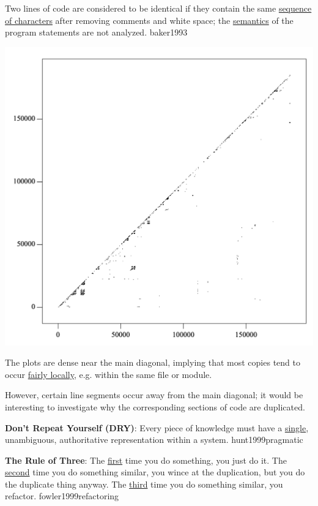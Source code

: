 \documentclass{article}
\begin{document}
  {Two lines of code are considered to be identical if they contain the same \ul{sequence of characters} after removing comments and white space; the \ul{semantics} of the program statements are not analyzed.}
  {baker1993}

\begin{multicols}{2}
\includegraphics[width=.9\columnwidth]{scatter.png}
\par\columnbreak\par
The plots are dense near the main diagonal, implying
that most copies tend to occur \ul{fairly locally}, e.g. within the
same file or module. \par However, certain line segments occur
away from the main diagonal; it would be interesting to
investigate why the corresponding sections of code are
duplicated.
\end{multicols}
\plush{}

  {\textbf{Don't Repeat Yourself (DRY)}: Every piece of knowledge must have a \ul{single}, unambiguous, authoritative representation within a system.}
  {hunt1999pragmatic}

  {\textbf{The Rule of Three}: The \ul{first} time you do something, you just do it. The \ul{second} time you do something similar, you wince at the duplication, but you do the duplicate thing anyway. The \ul{third} time you do something similar, you refactor.}
  {fowler1999refactoring}
\end{document}
